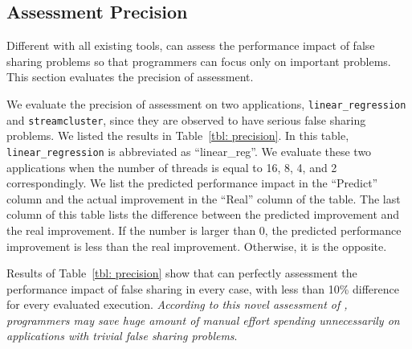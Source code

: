 \subsection{Assessment Precision}
\label{sec:precision}

Different with all existing tools, \cheetah{} can assess the performance impact of false sharing problems so that programmers can focus only on important problems. This section evaluates the precision of assessment. 

We evaluate the precision of assessment on two applications, \texttt{linear\_regression} and \texttt{streamcluster}, since they are observed to have serious false sharing problems. We listed the results in Table~\ref{tbl: precision}. In this table, \texttt{linear\_regression} is abbreviated as ``linear\_reg''.  We evaluate these two applications when the number of threads is equal to 16, 8, 4, and 2 correspondingly. We list the predicted performance impact in the ``Predict'' column and the actual improvement in the ``Real'' column of the table. The last column of this table lists the difference between the predicted improvement and the real improvement. If the number is larger than 0, the predicted performance improvement is less than the real improvement. Otherwise, it is the opposite. 

Results of Table~\ref{tbl: precision} show that \cheetah{} can perfectly assessment the performance impact of false sharing in every case, with less than 10\% difference for every evaluated execution. %
\emph{According to this novel assessment of \cheetah{}, programmers may save huge amount of manual effort spending unnecessarily on applications with trivial false sharing problems}. 

